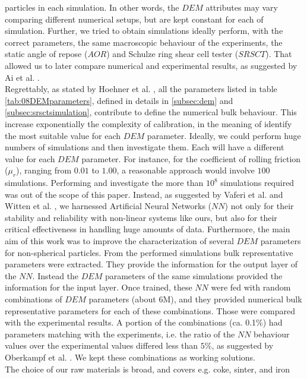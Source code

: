 particles in each simulation. 
In other words, the $DEM$ attributes may vary comparing different 
numerical setups, but are kept constant for each of simulation. 
Further, we tried to obtain simulations ideally perform, with the correct parameters, 
the same macroscopic behaviour of the experiments, the static angle of repose
($AOR$) and Schulze ring shear cell tester ($SRSCT$). That allowed us to later
compare numerical and experimental results, as suggested by Ai et al.
\cite{RefWorks:131}.\\
Regrettably, as stated by Hoehner et al. \cite{RefWorks:86}, all the parameters
listed in table \ref{tab:08DEMparameters}, defined in details in
\ref{subsec:dem} and \ref{subsec:srsctsimulation}, contribute to define the
numerical bulk behaviour.
This increase exponentially the complexity of calibration, in the meaning of 
identify the most suitable value for each $DEM$ parameter.
Ideally, we could perform huge numbers of simulations and then investigate them.
Each will have a different value for each $DEM$ parameter.
For instance, for the coefficient of rolling friction ($\mu_r$), ranging from
$0.01$ to $1.00$, a reasonable approach would involve $100$ simulations.
Performing and investigate the 
more than $10^8$ simulations required was out of the scope of this paper.
Instead, as suggested by Vaferi et al. \cite{RefWorks:150} and Witten et al.
\cite{RefWorks:174}, we harnessed Artificial Neural Networks ($NN$) not only for
their stability and reliability with non-linear systems like ours,
but also for their critical effectiveness in handling huge amounts of data.
Furthermore, the main aim of this work was to improve the characterization 
of several $DEM$ parameters for non-spherical particles. 
From the performed simulations bulk representative parameters were extracted. 
They provide the information for the output layer of the $NN$. Instead the $DEM$ 
parameters of the same simulations provided the information for the input layer. 
Once trained, these $NN$ were fed with random combinations of $DEM$ parameters
(about 6M), and they provided numerical bulk representative parameters for each
of these combinations.
Those were compared with the experimental results. A portion of the combinations
(ca. 0.1\%) had parameters matching with the experiments, i.e. the ratio of the $NN$ behaviour
values over the experimental values differed less than $5\%$, as suggested by
Oberkampf et al. \cite{RefWorks:160}.
We kept these combinations as working solutions. \\
The choice of our raw materials is broad, and covers e.g. coke, sinter, and iron
